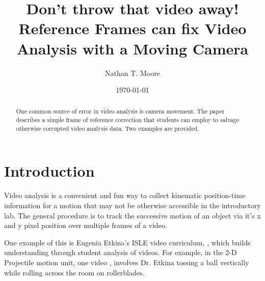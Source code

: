 \documentclass[prb,twocolumn]{revtex4-2}
\begin{document}
\title{Don't throw that video away!\\ Reference Frames can fix Video Analysis with a Moving Camera}

\author{Nathan T. Moore}

\date{\today}

\begin{abstract}
One common source of error in video analysis is camera movement.  The paper describes a simple frame of reference correction that students can employ to salvage otherwise corrupted video analysis data.  Two examples are provided. 
\end{abstract}

\maketitle %


\section{Introduction} 
Video analysis is a convenient and fun way to collect kinematic position-time information for a motion that may not be otherwise accessible in the introductory lab.  The general procedure is to track the successive motion of an object via it's x and y pixel position over multiple frames of a video.  

One example of this is Eugenia Etkina's  ISLE video curriculum, \cite{ISLE_site}, which builds understanding through student analysis of videos.  For example, in the 2-D Projectile motion unit,
one video \cite{ISLE_ball_video_source}, involves Dr. Etkina tossing a ball vertically while rolling across the room on rollerblades. 
\end{document}
